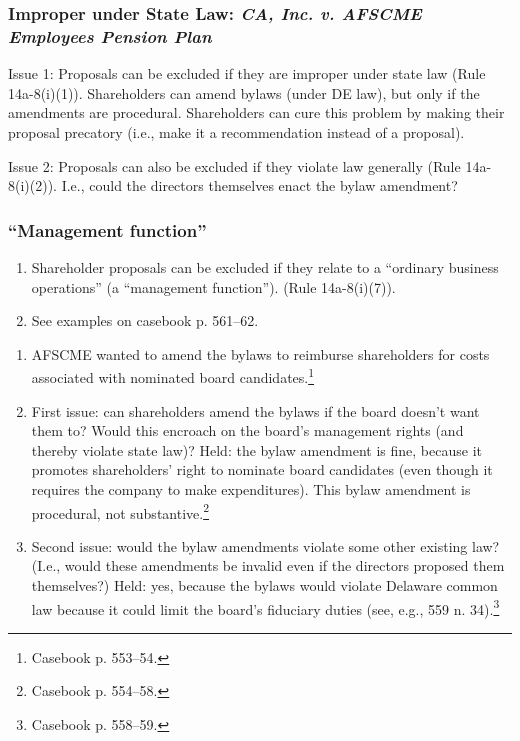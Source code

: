 \subsubsection{Improper under State Law: \emph{CA, Inc. v. AFSCME Employees 
Pension Plan}}

Issue 1: Proposals can be excluded if they are improper under state law (Rule 
14a-8(i)(1)). Shareholders can amend bylaws (under DE law), but only if the 
amendments are procedural. Shareholders can cure this problem by making their 
proposal precatory (i.e., make it a recommendation instead of a proposal).

Issue 2: Proposals can also be excluded if they violate law generally (Rule 
14a-8(i)(2)). I.e., could the directors themselves enact the bylaw amendment?

\subsubsection{``Management function''}

\begin{enumerate}
    \item Shareholder proposals can be excluded if they relate to a ``ordinary 
    business operations'' (a ``management function''). (Rule 14a-8(i)(7)).
    \item See examples on casebook p. 561--62.
\end{enumerate}

\begin{enumerate}
    \item AFSCME wanted to amend the bylaws to reimburse shareholders for 
    costs associated with nominated board candidates.\footnote{Casebook p. 
    553--54.}
    \item First issue: can shareholders amend the bylaws if the board doesn't 
    want them to? Would this encroach on the board's management rights (and 
    thereby violate state law)? Held: the bylaw amendment is fine, because it 
    promotes shareholders' right to nominate board candidates (even though it 
    requires the company to make expenditures). This bylaw amendment is 
    procedural, not substantive.\footnote{Casebook p. 554--58.}
    \item Second issue: would the bylaw amendments violate some other existing law? 
    (I.e., would these amendments be invalid even if the directors proposed 
    them themselves?) Held: yes, because the bylaws would violate Delaware 
    common law because it could limit the board's fiduciary duties (see, e.g., 
    559 n. 34).\footnote{Casebook p. 558--59.}
\end{enumerate}


